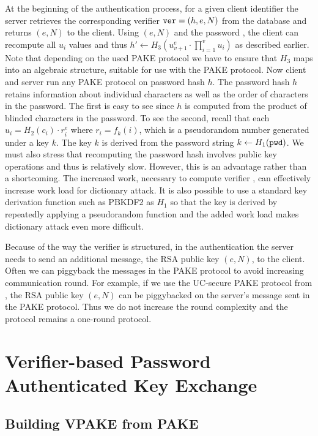 At the beginning of the authentication process, for a given client identifier the server retrieves the corresponding verifier $\mathtt{ver}=(h, e, N)$ from the database and returns $(e,N)$ to the client.
Using $(e,N)$ and the password \pwd, the client can recompute all $u_i$ values and thus $h'\gets H_3(u_{v+1}^e\cdot\prod_{i=1}^{v}u_i)$ as described earlier.
Note that depending on the used PAKE protocol we have to ensure that $H_3$ maps into an algebraic structure, suitable for use with the PAKE protocol.
Now client and server run any PAKE protocol on password hash $h$. The password hash $h$ retains information about individual characters as well as the order of characters in the password. The first is easy to see since $h$ is computed from the product of blinded characters in the password.  
To see the second, recall that each $u_i=H_2(c_i)\cdot r_i^e$ where $r_i=f_k(i)$, which is a pseudorandom number generated under a key $k$. 
The key $k$ is derived from the password string $k\gets H_1(\mathtt{pwd})$. 
We must also stress that recomputing the password hash involves public key operations and thus is relatively slow.
However, this is an advantage rather than a shortcoming. 
The increased work, necessary to compute verifier \ver, can effectively increase work load for dictionary attack. 
It is also possible to use a standard key derivation function such as PBKDF2 \cite{rfc2898} as $H_1$ so that the key is derived by repeatedly applying a pseudorandom function and the added work load makes dictionary attack even more difficult.

Because of the way the verifier is structured, in the authentication the server needs to send an additional message, the RSA public key $(e,N)$, to the client. Often we can piggyback the messages in the PAKE protocol to avoid increasing communication round. 
For example, if we use the UC-secure PAKE protocol from \citet{Benhamouda2013}, the RSA public key $(e,N)$ can be piggybacked on the server's message sent in the PAKE protocol. Thus we do not increase the round complexity and the protocol remains a one-round protocol.


\section{Verifier-based Password Authenticated Key Exchange} \label{sec:vpake-pake}

\subsection{Building VPAKE from PAKE}

